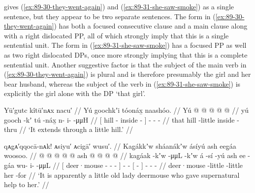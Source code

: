 \citeauthor{swanton:1909} gives (\ref{ex:89-30-they-went-again}) and (\ref{ex:89-31-she-saw-smoke}) as a single sentence, but they appear to be two separate sentences.
The form in (\ref{ex:89-30-they-went-again}) has both a focused consecutive clause and a main clause along with a right dislocated PP, all of which strongly imply that this is a single sentential unit.
The form in (\ref{ex:89-31-she-saw-smoke}) has a focused PP as well as two right dislocated DPs, once more strongly implying that this is a complete sentential unit.
Another suggestive factor is that the subject of the main verb in (\ref{ex:89-30-they-went-again}) is plural and is therefore presumably the girl and her bear husband, whereas the subject of the verb in (\ref{ex:89-31-she-saw-smoke}) is explicitly the girl alone with the DP  ‘that girl’.

\ex\label{ex:89-32-extends-through-little-hill}%
%
\begingl
	\glpreamble	Yū′gutc kîtū′nᴀx nacu′  //
	\glpreamble	Yú goochkʼi tóonáx̱ naashóo. //
	\gla	{} Yú  @ {}  @ {} {}
		 @ {} @ {} @ {} //
	\glb	{} yú gooch -kʼ tú -náx̱ {}
		n- i-  -μμH //
	\glc	{}[  hill - inside - {}]
		- -  - //
	\gld	{} that hill -little inside -thru {}
		 {} {} {} //
	\glft	‘It extends through a little hill.’
		//
\endgl
\xe

\ex\label{ex:89-33-deermouse-super-help}%
%
\begingl
	\glpreamble	qᴀg̣ᴀ′qqocā-nᴀk! ᴀsiyu′ ᴀcigā′ wusu′. //
	\glpreamble	Kag̱ákkʼw sháanákʼw ásíyú ash eeg̱áa woosoo. //
	\gla	{}  @ {}  @ {} @ {} {}
		 @ {} @ {}
		{} ash  @ {} {}
		 @ {} @ {} @ {} //
	\glb	{} kag̱áak -kʼw  -μμL -kʼw {}
		á -sí -yú
		{} ash ee -g̱áa {}
		wu- i-  -μμL //
	\glc	{}[ deer·mouse -  - - {}]
		 - -
		{}[   - {}]
		- -  - //
	\gld	{} deer·mouse -little  {} -little {}
		 {} {}
		{} her {} -for {}
		 {} {} {} //
	\glft	‘It is apparently a little old lady deermouse who gave supernatural help to her.’
		//
\endgl
\xe

